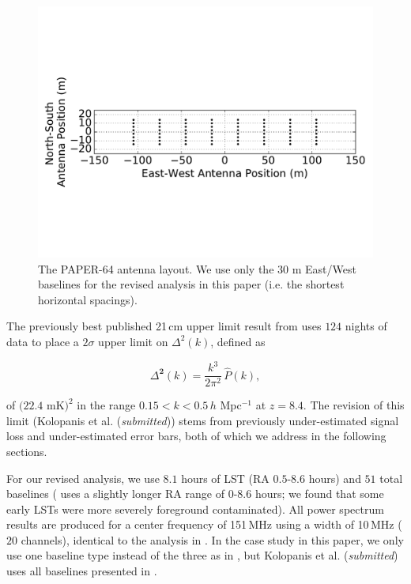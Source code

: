 \documentclass[preprint2,numberedappendix,tighten]{aastex6}
\begin{document}
\begin{figure}
	\centering
	\includegraphics[trim={0cm 3cm 0cm 3cm},width=\columnwidth]{plots/ant_layout_aspect.pdf}
	\caption{The PAPER-64 antenna layout. We use only the $30$ m East/West baselines for the revised analysis in this 
paper (i.e. the shortest horizontal spacings).}
	\label{fig:ant_layout}
\end{figure}

The previously best published 21\,cm upper limit result from  uses $124$ nights of data to place a $2\sigma$ upper limit 
on $\Delta^{2}(k)$, defined as

\begin{equation}
\Delta^{\textbf{2}}(k) = \frac{k^{3}}{2\pi^{2}}\,\hat{P}(k),
\end{equation}

\noindent of $(22.4$ mK$)^{2}$ in the range $0.15 < k < 0.5$\,$h$ Mpc$^{-1}$ at $z = 8.4$. The revision of this limit (Kolopanis et al. (\textit{submitted})) stems from previously under-estimated signal loss and under-estimated error bars, both of which we 
address in the following sections. 

For our revised analysis, we use $8.1$ hours of LST (RA $0.5$-$8.6$ hours) and $51$ total baselines ( uses a slightly longer RA 
range of $0$-$8.6$ hours; we found that some early LSTs were more severely foreground contaminated). All power spectrum results are produced for a center frequency of 151\,MHz using a width of 10\,MHz ($20$ channels), identical to the analysis in . In the case study in this paper, we only use one baseline type instead of the three as in 
, but Kolopanis et al. (\textit{submitted}) uses all baselines presented in .
\end{document}
